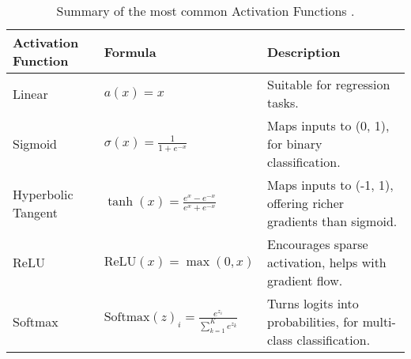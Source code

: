\begin{table}[htb!]
\caption{Summary of the most common Activation Functions \cite{goodfellow_deep_2016}.}
\label{Tables:ActivationFunctions}
\centering
\footnotesize
\begin{tabularx}{\textwidth}{@{}lXl@{}}
\toprule
\textbf{Activation Function} & \textbf{Formula} & \textbf{Description} \\
\midrule
Linear & \( a(x) = x \) & Suitable for regression tasks. \\
\addlinespace
Sigmoid & \( \sigma(x) = \frac{1}{1 + e^{-x}} \) & Maps inputs to (0, 1), for binary classification. \\
\addlinespace
Hyperbolic Tangent & \( \tanh(x) = \frac{e^{x} - e^{-x}}{e^{x} + e^{-x}} \) & Maps inputs to (-1, 1), offering richer gradients than sigmoid. \\
\addlinespace
ReLU & \( \text{ReLU}(x) = \max(0, x) \) & Encourages sparse activation, helps with gradient flow. \\
\addlinespace
Softmax & \( \text{Softmax}(z)_i = \frac{e^{z_i}}{\sum_{k=1}^K e^{z_k}} \) & Turns logits into probabilities, for multi-class classification. \\
\bottomrule
\end{tabularx}
\end{table}

